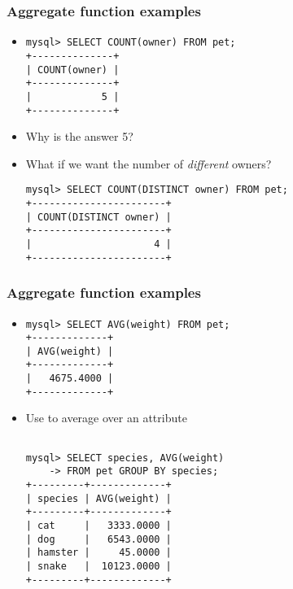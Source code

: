 \documentclass[hyperref={pdfpagelabels=false},svgnames,xcolor=table]{beamer}
\begin{document}
\begin{frame}[shrink=10,fragile]
  \frametitle{Aggregate function examples}
  \begin{itemize}
    \item {\color{blue}{COUNT}}
\begin{verbatim}
mysql> SELECT COUNT(owner) FROM pet;
+--------------+
| COUNT(owner) |
+--------------+
|            5 |
+--------------+

\end{verbatim}
    \item Why is the answer 5? 
    \item What if we want the number of \emph{different}
      owners?
\begin{verbatim}
mysql> SELECT COUNT(DISTINCT owner) FROM pet;
+-----------------------+
| COUNT(DISTINCT owner) |
+-----------------------+
|                     4 |
+-----------------------+
\end{verbatim}
  \end{itemize}
\end{frame}

\begin{frame}[shrink=10,fragile]
  \frametitle{Aggregate function examples}
  \begin{itemize}
    \item {\color{blue}{AVG}}
\begin{verbatim}
mysql> SELECT AVG(weight) FROM pet;
+-------------+
| AVG(weight) |
+-------------+
|   4675.4000 |
+-------------+

\end{verbatim}
    \item Use {\color{blue}{GROUP BY}} to average over an attribute
\begin{verbatim}

mysql> SELECT species, AVG(weight) 
    -> FROM pet GROUP BY species;
+---------+-------------+
| species | AVG(weight) |
+---------+-------------+
| cat     |   3333.0000 |
| dog     |   6543.0000 |
| hamster |     45.0000 |
| snake   |  10123.0000 |
+---------+-------------+
\end{verbatim}
  \end{itemize}
\end{frame}
\end{document}
